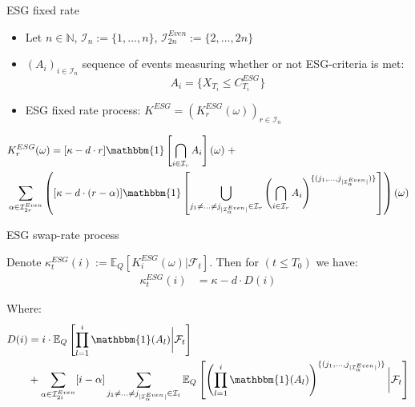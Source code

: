 \documentclass[UKenglish]{beamer}
\newcommand{\E}{\mathbb{E}}  %
\newcommand{\F}{\mathcal{F}} %
\begin{document}
\begin{frame}{ESG fixed rate}
\begin{itemize}
    \item Let $n\in \mathbb{N}$, $\mathcal{I}_{n} := \{1, \dots, n\}$, $\mathcal{I}_{2n}^{Even} := \{2, \dots, 2n\}$
    \item $(A_{i})_{i \in \mathcal{I}_{n}}$ sequence of events measuring whether or not ESG-criteria is met:
    \[
    A_{i} = \{X_{T_{i}} \leq C_{T_{i}}^{ESG}\}
    \]
    \item ESG fixed rate process: $K^{ESG} = (K_{r}^{ESG}(\omega))_{r\in \mathcal{I}_{n}}$ 
\end{itemize}

\begin{observation}
\begin{align*}
&K_{r}^{ESG}(\omega) = 
[\kappa -d\cdot r]\mathbbm{1}\left[
\bigcap_{i\in \mathcal{I}_{r}}A_{i}
\right](\omega)\; +\\ 
&\sum_{\alpha \in \mathcal{I}_{2r}^{Even}}
\left(
[\kappa -d\cdot (r-\alpha)]\mathbbm{1}\left[
\bigcup_{
j_{1}\neq \dots \neq j_{|\mathcal{I}_{\alpha}^{Even}|}
\in \mathcal{I}_{r}
}\left(
\bigcap_{i\in \mathcal{I}_{r}}A_{i}
\right)^{
\{
(j_{1}, \dots , j_{|\mathcal{I}_{\alpha}^{Even}|})
\}
}
\right]
\right)(\omega) 
\end{align*} 
\end{observation}
\end{frame}


\begin{frame}{ESG swap-rate process}
\begin{proposition}[Swap rate process $\kappa_{t}^{ESG} = (\kappa_{t}^{ESG}(i))_{i\in \mathcal{I}_{n}}$]
Denote $\kappa_{t}^{ESG}(i) := \E_{Q}[K_{i}^{ESG}(\omega)|\F_{t}]$. 
Then for $(t\leq T_{0})$ we have: 
\begin{align*}
\kappa_{t}^{ESG}(i)
&= 
\kappa -d\cdot D(i)
\end{align*}

Where: 
\begin{align*}
 D(i) &= 
i\cdot \E_{Q}\left[
\prod_{l=1}^{i}\mathbbm{1}(A_{l})\bigg{|}\F_{t}
\right] \\
&+ 
\sum_{\alpha \in \mathcal{I}_{2i}^{Even}}[i-\alpha]
\sum_{
j_{1}\neq \dots \neq j_{|\mathcal{I}_{\alpha}^{Even}|}
\in \mathcal{I}_{i}
}
\E_{Q}\left[
\left(
\prod_{l=1}^{i}\mathbbm{1}(A_{l})
\right)^{
\{
(j_{1}, \dots , j_{|\mathcal{I}_{\alpha}^{Even}|})
\}
}
\bigg{|}\F_{t}
\right]   
\end{align*}
\end{proposition}
\end{frame}
\end{document}
